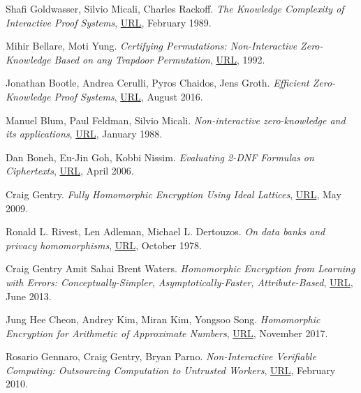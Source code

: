 \documentclass{Resources/UoBLab1}
\theoremstyle{definition}
\begin{document}
\begin{thebibliography}{10}
 Shafi Goldwasser, Silvio Micali, Charles Rackoff. \textit{The Knowledge Complexity of Interactive Proof Systems}, \href{https://people.csail.mit.edu/silvio/Selected%20Scientific%20Papers/Proof%20Systems/The_Knowledge_Complexity_Of_Interactive_Proof_Systems.pdf}{URL}, February 1989.

 Mihir Bellare, Moti Yung. \textit{Certifying Permutations: Non-Interactive Zero-Knowledge Based on any Trapdoor Permutation}, \href{https://cseweb.ucsd.edu/~mihir/papers/cct.pdf}{URL}, 1992.

 Jonathan Bootle, Andrea Cerulli, Pyros Chaidos, Jens Groth. \textit{Efficient Zero-Knowledge Proof Systems}, \href{https://link.springer.com/chapter/10.1007/978-3-319-43005-8_1}{URL}, August 2016.

 Manuel Blum, Paul Feldman, Silvio Micali. \textit{Non-interactive zero-knowledge and its applications}, \href{https://doi.org/10.1145/62212.62222}{URL}, January 1988. 

 Dan Boneh, Eu-Jin Goh, Kobbi Nissim. \textit{Evaluating 2-DNF Formulas on Ciphertexts}, \href{https://crypto.stanford.edu/~dabo/papers/2dnf.pdf}{URL}, April 2006.

 Craig Gentry. \textit{Fully Homomorphic Encryption Using Ideal Lattices}, \href{https://www.cs.cmu.edu/~odonnell/hits09/gentry-homomorphic-encryption.pdf}{URL}, May 2009.

 Ronald L. Rivest, Len Adleman, Michael L. Dertouzos. \textit{On data banks and privacy homomorphisms}, \href{https://luca-giuzzi.unibs.it/corsi/Support/papers-cryptography/RAD78.pdf}{URL}, October 1978.

 Craig Gentry Amit Sahai Brent Waters. \textit{Homomorphic Encryption from Learning with Errors: Conceptually-Simpler, Asymptotically-Faster, Attribute-Based}, \href{https://eprint.iacr.org/2013/340.pdf}{URL}, June 2013.

 Jung Hee Cheon, Andrey Kim, Miran Kim, Yongsoo Song. \textit{Homomorphic Encryption for Arithmetic of Approximate Numbers}, \href{https://link.springer.com/chapter/10.1007/978-3-319-70694-8_15}{URL}, November 2017.

 Rosario Gennaro, Craig Gentry, Bryan Parno. \textit{Non-Interactive Verifiable Computing: Outsourcing Computation to Untrusted Workers}, \href{https://eprint.iacr.org/2009/547.pdf}{URL}, February 2010.


\end{thebibliography}
\end{document}
